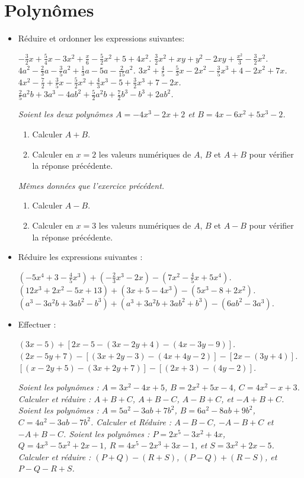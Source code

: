 \chapter{Polynômes}

\begin{itemize}
\item Réduire et ordonner les expressions suivantes: 
\begin{itemize}
\it $-\frac32 x + \frac54 x-3x^2+\frac{x}6-\frac52 x^2+5+4x^2$.
\it $\frac32 x^2+xy+y^2-2xy+\frac{x^2}3-\frac32x^2$.
\it $4a^2-\frac23a-\frac35a^2+\frac13a-5a-\frac2{15}a^2$.
\it $3x^2+\frac45 - \frac53x - 2x^2 -\frac35x^3 + 4 - 2 x^2 + 7x$. 
\it $4x^2 - \frac72 + \frac35x - \frac52x^2 + \frac43 x^3 - 5 + \frac32 x^3 + 7 - 2x$. 
\it $\frac25 a^2b + 3a^3 -4ab^2 + \frac52 a^2b + \frac72b^3 - b^3 + 2ab^2$. 
\end{itemize}
\it Soient les deux polynômes $A= -4x^3 - 2x+2$ et $B= 4x-6x^2 + 5x^3 - 2$. \begin{enumerate}
\item Calculer $A+B$. 
\item Calculer en $x=2$ les valeurs numériques de $A$, $B$ et $A+B$ pour vérifier la réponse précédente. 
\end{enumerate}
\it Mêmes données que l'exercice précédent.
\begin{enumerate}
\item Calculer $A-B$.
\item Calculer en $x=3$ les valeurs numériques de $A$, $B$ et $A-B$ pour vérifier la réponse précédente. 
\end{enumerate}
\item Réduire les expressions suivantes : 
\begin{itemize}
\it$ \left(-5 x^4 + 3 - \frac45 x^3\right) + \left( 
-\frac23 x^3 - 2x\right) - \left( 7x^2 - \frac45 x + 5x^4\right)$.
\it $(12x^3+2x^2-5x+13) + (3x+5-4x^3)- (5x^3-8+2x^2)$.
\it $(a^3-3a^2b+3ab^2-b^3) + (a^3+3a^2b+3ab^2+b^3) - (6ab^2-3a^3)$. 
\end{itemize}
\item Effectuer : \begin{itemize}
\it $(3x-5)+[2x-5 - (3x-2y+4) - (4x-3y-9)]$.
\it $(2x-5y+7) - [(3x+2y-3)-(4x+4y-2)]-[2x-(3y+4)]$. 
\it $[(x-2y+5) - (3x+2y+7)]-[(2x+3)-(4y-2)]$. 
\end{itemize}
\it Soient les polynômes : $A=3x^2-4x+5$, $B=2x^2+5x-4$, $C= 4x^2-x+3$. 
Calculer et réduire : $A+B+C$, $A+B-C$, $A-B+C$, et $-A+B+C$. 
\it Soient les polynômes : $A=5a^2-3ab+7b^2$, $B=6a^2-8ab+9b^2$, $C= 4a^2-3ab-7b^2$. 
Calculer et Réduire : $A-B-C$, $-A-B+C$ et $-A+B-C$.
\it Soient les polynômes : $P=2x^5-3x^2+4x$, $Q=4x^3 - 5x^2 +2x-1$, $R = 4x^5 - 2x^3 + 3x -1$, et $S= 3x^2+2x-5$. 
Calculer et réduire : $(P+Q)-(R+S)$, $(P-Q)+(R-S)$, et $P-Q-R+S$. 
\end{itemize}